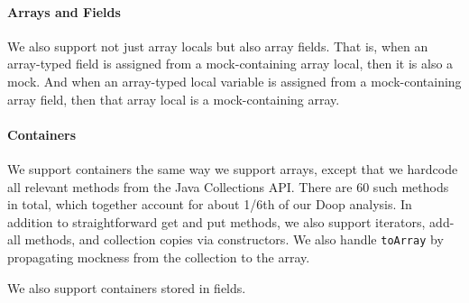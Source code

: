 \paragraph{Arrays and Fields} We also support not just array locals but also array fields. That is, when an array-typed field is assigned from a mock-containing array local, then it is also a mock. And when an array-typed local variable is assigned from a mock-containing array field, then that array local is a mock-containing array.

\paragraph{Containers} We support containers the same way we support arrays, except that we hardcode all relevant methods from the Java Collections API. There are 60 such methods in total, which together account for about 1/6th of our Doop analysis. In addition to straightforward get and put methods, we also support iterators, add-all methods, and collection copies via constructors. We also handle {\tt toArray} by propagating mockness from the collection to the array.

We also support containers stored in fields.
